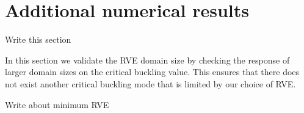 \documentclass[10pt,twoside]{fernandes_supp}
\newcommand{\mf}[1]{\colorbox{blue!10}{\color{color3}#1}}
\begin{document}
\section{Additional numerical results}
\mf{Write this section}

In this section we validate the RVE domain size by checking the response of larger domain sizes on the critical buckling value. This ensures that there does not exist another critical buckling mode that is limited by our choice of RVE.

\mf{Write about minimum RVE}


\nocite{aizenberg2005}
\nocite{deshpande2001}
\nocite{miserez2008}
\nocite{weaver2010}



% 
\end{document}
